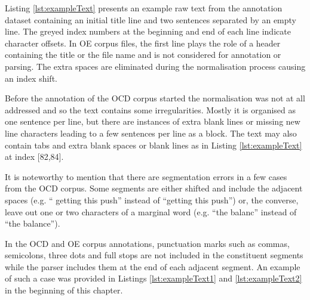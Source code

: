     Listing \ref{lst:exampleText} presents an example raw text from the annotation dataset containing an initial title line and two sentences separated by an empty line. The greyed index numbers at the beginning and end of each line indicate character offsets. In OE corpus files, the first line plays the role of a header containing the title or the file name and is not considered for annotation or parsing. The extra spaces are eliminated during the normalisation process causing an index shift. 
    
    Before the annotation of the OCD corpus started the normalisation was not at all addressed and so the text contains some irregularities. Mostly it is organised as one sentence per line, but there are instances of extra blank lines or missing new line characters leading to a few sentences per line as a block. The text may also contain tabs and extra blank spaces or blank lines as in Listing \ref{lst:exampleText} at index [82,84]. 

    It is noteworthy to mention that there are segmentation errors in a few cases from the OCD corpus. Some segments are either shifted and include the adjacent spaces (e.g. `` getting this push'' instead of ``getting this push'') or, the converse, leave out one or two characters of a marginal word (e.g. ``the balanc'' instead of ``the balance'').  


    In the OCD and OE corpus annotations, punctuation marks such as commas, semicolons, three dots and full stops are not included in the constituent segments while the parser includes them at the end of each adjacent segment. An example of such a case was provided in Listings \ref{lst:exampleText1} and \ref{lst:exampleText2} in the beginning of this chapter. 
    
